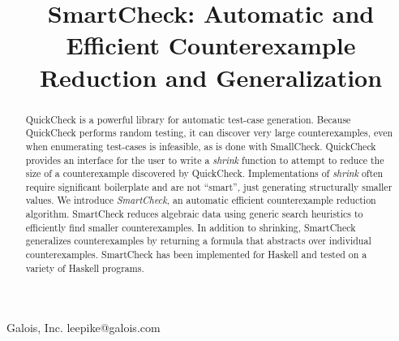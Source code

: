 \documentclass[10pt]{sigplanconf}
\begin{document}


\title{SmartCheck: Automatic and Efficient Counterexample Reduction and Generalization}

           {Galois, Inc.}
           {leepike@galois.com}
\maketitle

\begin{abstract}
QuickCheck is a powerful library for automatic test-case generation.  Because
QuickCheck performs random testing, it can discover very large counterexamples,
even when enumerating test-cases is infeasible, as is done with SmallCheck.
QuickCheck provides an interface for the user to write a \emph{shrink} function
to attempt to reduce the size of a counterexample discovered by QuickCheck.
Implementations of \emph{shrink} often require significant boilerplate and are
not ``smart'', just generating structurally smaller values.  We introduce
\emph{SmartCheck}, an automatic efficient counterexample reduction algorithm.
SmartCheck reduces algebraic data using generic search heuristics to efficiently
find smaller counterexamples.  In addition to shrinking, SmartCheck generalizes
counterexamples by returning a formula that abstracts over individual
counterexamples.  SmartCheck has been implemented for Haskell and tested on a
variety of Haskell programs.
\end{abstract}




\end{document}
